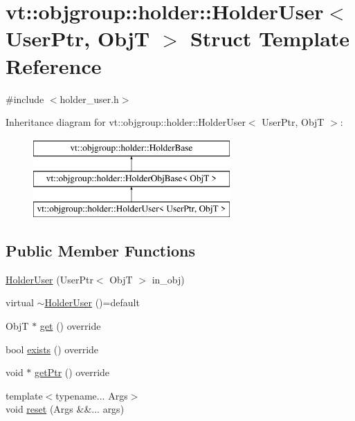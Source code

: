 \hypertarget{structvt_1_1objgroup_1_1holder_1_1_holder_user}{}\section{vt\+:\+:objgroup\+:\+:holder\+:\+:Holder\+User$<$ User\+Ptr, ObjT $>$ Struct Template Reference}
\label{structvt_1_1objgroup_1_1holder_1_1_holder_user}


{\ttfamily \#include $<$holder\+\_\+user.\+h$>$}

Inheritance diagram for vt\+:\+:objgroup\+:\+:holder\+:\+:Holder\+User$<$ User\+Ptr, ObjT $>$\+:\begin{figure}[H]
\begin{center}
\leavevmode
\includegraphics[height=3.000000cm]{structvt_1_1objgroup_1_1holder_1_1_holder_user}
\end{center}
\end{figure}
\subsection*{Public Member Functions}
\begin{DoxyCompactItemize}
\item 
\hyperlink{structvt_1_1objgroup_1_1holder_1_1_holder_user_a5c81ffca6d44450a02c9d74c650d2178}{Holder\+User} (User\+Ptr$<$ ObjT $>$ in\+\_\+obj)
\item 
virtual \hyperlink{structvt_1_1objgroup_1_1holder_1_1_holder_user_a694de38808a7075ef8fa919d9e983c8b}{$\sim$\+Holder\+User} ()=default
\item 
ObjT $\ast$ \hyperlink{structvt_1_1objgroup_1_1holder_1_1_holder_user_a102b494316b9f906a02f1c47b797e339}{get} () override
\item 
bool \hyperlink{structvt_1_1objgroup_1_1holder_1_1_holder_user_abba92cc4a99e045b64a1865fe1477fb2}{exists} () override
\item 
void $\ast$ \hyperlink{structvt_1_1objgroup_1_1holder_1_1_holder_user_a92734867a29d21a7f165cbb4052717db}{get\+Ptr} () override
\item 
{\footnotesize template$<$typename... Args$>$ }\\void \hyperlink{structvt_1_1objgroup_1_1holder_1_1_holder_user_a4a43e5b38a0474cd523ccd9aa66950e9}{reset} (Args \&\&... args)
\end{DoxyCompactItemize}
